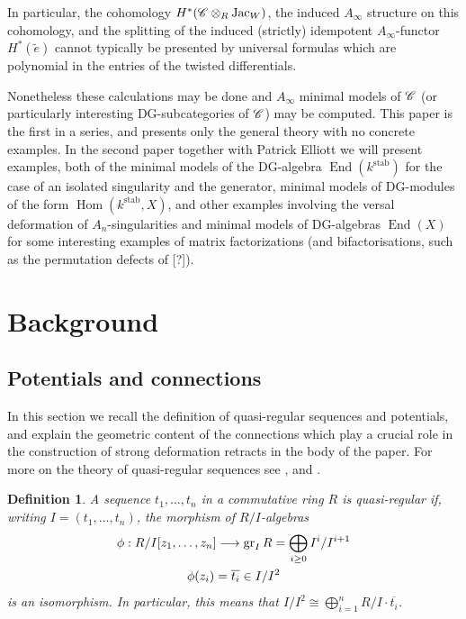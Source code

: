 \documentclass[english,letter paper,12pt,leqno]{article}
\theoremstyle{example}
\newtheorem{definition}[theorem]{Definition}
\numberwithin{equation}{section}
\def\stab{\operatorname{stab}}
\def\Hom{\operatorname{Hom}}
\def\jac{\operatorname{Jac}_W}
\DeclareMathOperator{\End}{End}
\begin{document}
In particular, the cohomology $H^*( \md{C} \otimes_R \jac )$, the induced $A_\infty$ structure on this cohomology, and the splitting of the induced (strictly) idempotent $A_\infty$-functor $H^*(\widetilde{e})$ cannot typically be presented by universal formulas which are polynomial in the entries of the twisted differentials. 

Nonetheless these calculations may be done and $A_\infty$ minimal models of $\mathscr{C}$ (or particularly interesting DG-subcategories of $\mathscr{C}$) may be computed. This paper is the first in a series, and presents only the general theory with no concrete examples. In the second paper together with Patrick Elliott we will present examples, both of the minimal models of the DG-algebra $\End(k^{\stab})$ for the case of an isolated singularity and the generator, minimal models of DG-modules of the form $\Hom(k^{\stab}, X)$, and other examples involving the versal deformation of $A_n$-singularities and minimal models of DG-algebras $\End(X)$ for some interesting examples of matrix factorizations (and bifactorisations, such as the permutation defects of [?]).

\newpage

\section{Background}

\subsection{Potentials and connections}

In this section we recall the definition of quasi-regular sequences and potentials, and explain the geometric content of the connections which play a crucial role in the construction of strong deformation retracts in the body of the paper. For more on the theory of quasi-regular sequences see \cite{matsumura}, \cite[Chapitre $0$ \S 15.1]{EGA4} and \cite[Section\,10.68]{stacks_project}.

\begin{definition} A sequence $t_1,\ldots,t_n$ in a commutative ring $R$ is \emph{quasi-regular} if, writing $I = (t_1,\ldots,t_n)$, the morphism of $R/I$-algebras
\begin{gather*}
\phi: R/I[z_1,\ldots,z_n] \longrightarrow \operatorname{gr}_I R = \bigoplus_{i \ge 0} I^i / I^{i+1}\\
\phi(z_i) = \overline{t_i} \in I/I^2
\end{gather*}
is an isomorphism. In particular, this means that $I/I^2 \cong \bigoplus_{i=1}^n R/I \cdot \overline{t_i}$.
\end{definition}
\end{document}
